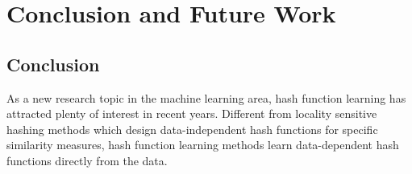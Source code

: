 
\chapter{Conclusion and Future Work}
\label{chap:conclusion}


\section{Conclusion}

As a new research topic in the machine learning area, hash function learning has attracted plenty of interest in recent years. Different from locality sensitive hashing methods which design data-independent hash functions for specific similarity measures, hash function learning methods learn data-dependent hash functions directly from the data.

